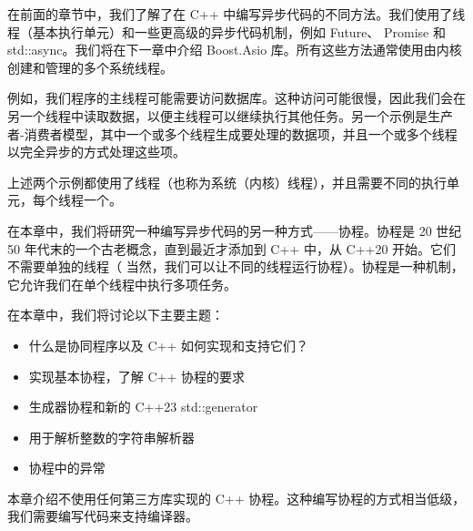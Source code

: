 在前面的章节中，我们了解了在 C++ 中编写异步代码的不同方法。我们使用了线程（基本执行单元）和一些更高级的异步代码机制，例如 Future、 Promise 和 std::async。我们将在下一章中介绍 Boost.Asio 库。所有这些方法通常使用由内核创建和管理的多个系统线程。

例如，我们程序的主线程可能需要访问数据库。这种访问可能很慢，因此我们会在另一个线程中读取数据，以便主线程可以继续执行其他任务。另一个示例是生产者-消费者模型，其中一个或多个线程生成要处理的数据项，并且一个或多个线程以完全异步的方式处理这些项。

上述两个示例都使用了线程（也称为系统（内核）线程），并且需要不同的执行单元，每个线程一个。

在本章中，我们将研究一种编写异步代码的另一种方式——协程。协程是 20 世纪 50 年代末的一个古老概念，直到最近才添加到 C++ 中，从 C++20 开始。它们不需要单独的线程（ 当然，我们可以让不同的线程运行协程）。协程是一种机制，它允许我们在单个线程中执行多项任务。

在本章中，我们将讨论以下主要主题：

\begin{itemize}
\item
什么是协同程序以及 C++ 如何实现和支持它们？

\item
实现基本协程，了解 C++ 协程的要求

\item
生成器协程和新的 C++23 std::generator

\item
用于解析整数的字符串解析器

\item
协程中的异常
\end{itemize}

本章介绍不使用任何第三方库实现的 C++ 协程。这种编写协程的方式相当低级，我们需要编写代码来支持编译器。

